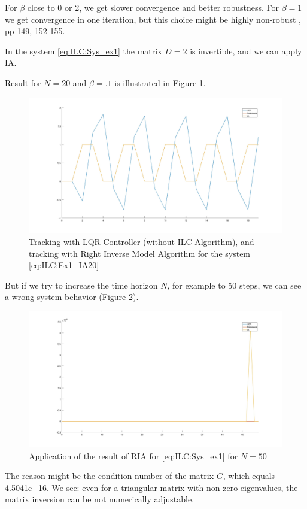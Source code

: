 For $\beta$ close to 0 or 2, we get slower convergence and better robustness. For $\beta = 1$ we get convergence in one iteration, but this choice might be highly non-robust \cite{ILC}, pp 149, 152-155.


\begin{exam}
	\label{ex:ILC:badIA}
	In the system \eqref{eq:ILC:Sys_ex1} the matrix $D = 2$ is invertible, and we can apply IA.
	
	Result for $N = 20$ and $\beta = .1$ is illustrated in Figure  \ref{img:ILC:Ex1_IA20}.
			
	\begin{figure}[ht]
		\label{img:ILC:Ex1_IA20}
		\includegraphics[width=\textwidth]{fig/Ex1_IA20.jpg}
		\caption{Tracking with LQR Controller (without ILC Algorithm), and tracking with Right Inverse Model Algorithm for the system \eqref{eq:ILC:Ex1_IA20}}
	\end{figure}
	
	But if we try to increase the time horizon $N$, for example to 50 steps, we can see a wrong system behavior (Figure \ref{img:ILC:Ex1_IA50}). 
		
			\begin{figure}[ht!]
			\centering
			\includegraphics[width=\textwidth]{fig/Ex1_IA50.jpg}
			\caption{Application of the result of RIA for \ref{eq:ILC:Sys_ex1} for $N = 50$}
			\label{img:ILC:Ex1_IA50}
		\end{figure}
	
	The reason might be the condition number of the matrix $G$, which equals 4.5041e+16. We see: even for a triangular matrix with non-zero eigenvalues, the matrix inversion can be not numerically adjustable.	
		
		
\end{exam}

